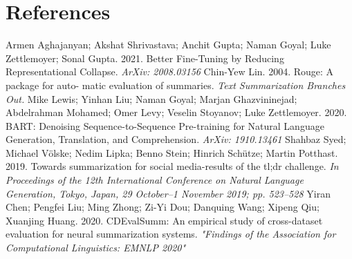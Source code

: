 \documentclass[11pt,a4paper, twocolumn]{article}
\begin{document}
\section*{References}
 \noindent Armen Aghajanyan; Akshat Shrivastava; Anchit Gupta; Naman Goyal; Luke Zettlemoyer; Sonal Gupta. 2021. Better Fine-Tuning by Reducing Representational Collapse. \emph{ArXiv: 2008.03156}
 \bigbreak
\noindent Chin-Yew Lin. 2004. Rouge: A package for auto-
matic evaluation of summaries. \emph{Text Summarization
Branches Out.}
\bigbreak
\noindent Mike Lewis; Yinhan Liu; Naman Goyal; Marjan Ghazvininejad; Abdelrahman Mohamed; Omer Levy; Veselin Stoyanov; Luke Zettlemoyer. 2020. BART: Denoising Sequence-to-Sequence Pre-training for Natural Language Generation, Translation, and Comprehension. \emph{ArXiv: 1910.13461}
\bigbreak
\noindent Shahbaz Syed; Michael Völske; Nedim Lipka; Benno Stein; Hinrich Schütze; Martin Potthast. 2019. Towards summarization for social media-results of the tl;dr
challenge. \emph{In Proceedings of the 12th International Conference on Natural Language Generation, Tokyo, Japan, 29 October–1
November 2019; pp. 523–528}
\bigbreak
\noindent Yiran Chen; Pengfei Liu; Ming Zhong; Zi-Yi Dou; Danquing Wang; Xipeng Qiu; Xuanjing Huang. 2020. CDEvalSumm: An empirical study of cross-dataset evaluation
for neural summarization systems. \emph{"Findings of the Association for Computational Linguistics: EMNLP 2020"}
\end{document}
